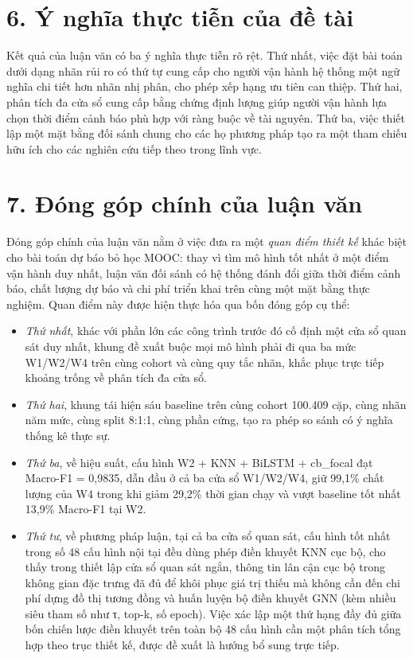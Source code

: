 \section*{6. Ý nghĩa thực tiễn của đề tài}

Kết quả của luận văn có ba ý nghĩa thực tiễn rõ rệt. Thứ nhất, việc đặt bài toán dưới dạng nhãn rủi ro có thứ tự cung cấp cho người vận hành hệ thống một ngữ nghĩa chi tiết hơn nhãn nhị phân, cho phép xếp hạng ưu tiên can thiệp. Thứ hai, phân tích đa cửa sổ cung cấp bằng chứng định lượng giúp người vận hành lựa chọn thời điểm cảnh báo phù hợp với ràng buộc về tài nguyên. Thứ ba, việc thiết lập một mặt bằng đối sánh chung cho các họ phương pháp tạo ra một tham chiếu hữu ích cho các nghiên cứu tiếp theo trong lĩnh vực.

\section*{7. Đóng góp chính của luận văn}

Đóng góp chính của luận văn nằm ở việc đưa ra một \emph{quan điểm thiết kế} khác biệt cho bài toán dự báo bỏ học MOOC: thay vì tìm mô hình tốt nhất ở một điểm vận hành duy nhất, luận văn đối sánh có hệ thống đánh đổi giữa thời điểm cảnh báo, chất lượng dự báo và chi phí triển khai trên cùng một mặt bằng thực nghiệm. Quan điểm này được hiện thực hóa qua bốn đóng góp cụ thể:

\begin{itemize}[leftmargin=1.2cm,topsep=3pt]
  \item \textit{Thứ nhất}, khác với phần lớn các công trình trước đó cố định một cửa sổ quan sát duy nhất, khung đề xuất buộc mọi mô hình phải đi qua ba mức W1/W2/W4 trên cùng cohort và cùng quy tắc nhãn, khắc phục trực tiếp khoảng trống về phân tích đa cửa sổ.
  \item \textit{Thứ hai}, khung tái hiện sáu baseline trên cùng cohort 100.409 cặp, cùng nhãn năm mức, cùng split 8:1:1, cùng phần cứng, tạo ra phép so sánh có ý nghĩa thống kê thực sự.
  \item \textit{Thứ ba}, về hiệu suất, cấu hình W2 + KNN + BiLSTM + cb\_focal đạt Macro-F1 = 0,9835, dẫn đầu ở cả ba cửa sổ W1/W2/W4, giữ 99,1\% chất lượng của W4 trong khi giảm 29,2\% thời gian chạy và vượt baseline tốt nhất 13,9\% Macro-F1 tại W2.
  \item \textit{Thứ tư}, về phương pháp luận, tại cả ba cửa sổ quan sát, cấu hình tốt nhất trong số 48 cấu hình nội tại đều dùng phép điền khuyết KNN cục bộ, cho thấy trong thiết lập cửa sổ quan sát ngắn, thông tin lân cận cục bộ trong không gian đặc trưng đã đủ để khôi phục giá trị thiếu mà không cần đến chi phí dựng đồ thị tương đồng và huấn luyện bộ điền khuyết GNN (kèm nhiều siêu tham số như τ, top-k, số epoch). Việc xác lập một thứ hạng đầy đủ giữa bốn chiến lược điền khuyết trên toàn bộ 48 cấu hình cần một phân tích tổng hợp theo trục thiết kế, được đề xuất là hướng bổ sung trực tiếp.
\end{itemize}

